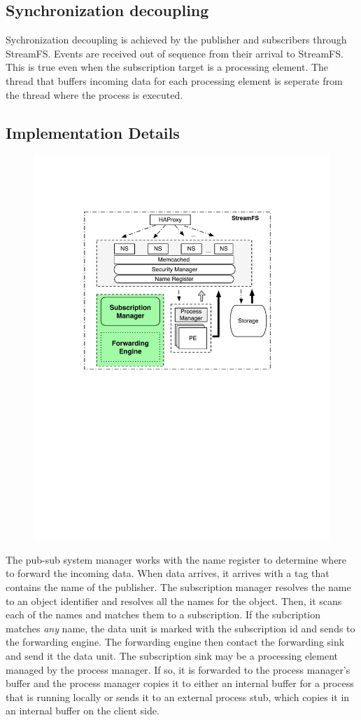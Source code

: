 \subsection{Synchronization decoupling}
Sychronization decoupling is achieved by the publisher and subscribers through StreamFS.  Events are received out of sequence
from their arrival to StreamFS.  This is true even when the subscription target is a processing element.  The thread that buffers
incoming data for each processing element is seperate from the thread where the process is executed.



\subsection{Implementation Details}

\begin{figure}[h!] %
\centering
\includegraphics[width=.55\columnwidth]{figs/submngr}
\caption{}
\label{fig:submngr}
\end{figure}

The pub-sub system manager works with the name register to determine where to forward the incoming data.  When data arrives, it arrives
with a tag that contains the name of the publisher.  The subscription manager resolves the name to an object identifier and resolves
all the names for the object.  Then, it scans each of the names and matches them to a subscription.  If the subcription matches \emph{any}
name, the data unit is marked with the subscription id and sends to the forwarding engine.  The forwarding engine then
contact the forwarding sink and send it the data unit.  The subscription sink may be a processing element managed by the process manager.
If so, it is forwarded to the process manager's buffer and the process manager copies it to either an internal buffer for a
process that is running locally or sends it to an external process stub, which copies it in an internal buffer on the client side.
